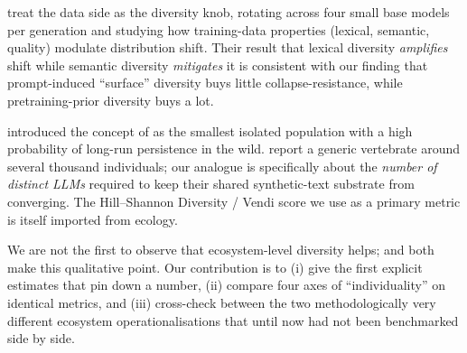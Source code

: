 \citet{kovac2025recursive} treat the data side as the diversity knob,
rotating across four small base models per generation and studying
how training-data properties (lexical, semantic, quality) modulate
distribution shift. Their result that lexical diversity \emph{amplifies}
shift while semantic diversity \emph{mitigates} it is consistent with
our finding that prompt-induced ``surface'' diversity buys little
collapse-resistance, while pretraining-prior diversity buys a lot.

\citet{shaffer1981minimum} introduced the concept of \mvp as the
smallest isolated population with a high probability of long-run
persistence in the wild. \citet{traill2007mvp} report a generic
vertebrate \mvp around several thousand individuals; our analogue is
specifically about the \emph{number of distinct LLMs} required to keep
their shared synthetic-text substrate from converging. The Hill--Shannon
Diversity / Vendi score \citep{friedman2023vendi} we use as a primary
metric is itself imported from ecology.

We are not the first to observe that ecosystem-level diversity helps;
\citet{hodel2026epistemic} and \citet{wang2025web} both make this
qualitative point. Our contribution is to (i) give the first explicit
\mvp estimates that pin down a number, (ii) compare four axes of
``individuality'' on identical metrics, and (iii) cross-check between
the two methodologically very different ecosystem operationalisations
that until now had not been benchmarked side by side.
